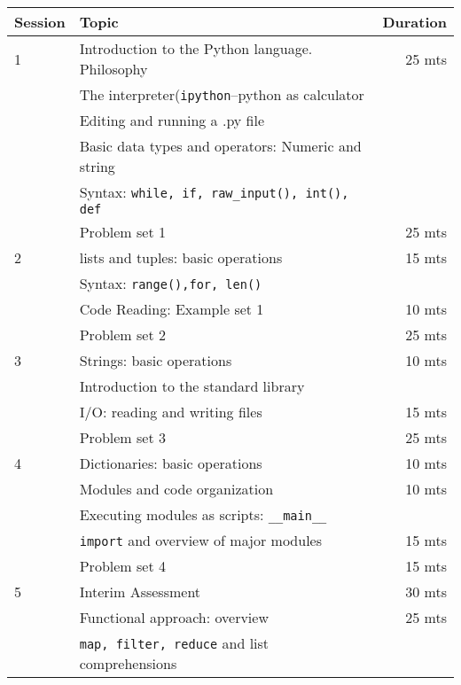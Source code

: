 \documentclass{article}
\begin{document}
\begin{tabular}{llr}
Session & Topic & Duration\\\hline
1 & Introduction to the Python language. Philosophy           & 25 mts\\
  & The interpreter(\texttt{ipython}--python as calculator        & \\
  & Editing and running a .py file                            & \\
  & Basic data types and operators: Numeric and string        & \\
  & Syntax: \tt{while, if, raw\_input(), int(), def}          & \\
  & Problem set 1                                             & 25 mts\\\hline

2 & lists and tuples: basic operations                        & 15 mts\\
  & Syntax: \tt{range(),for, len()}                           & \\
  & Code Reading: Example set 1                               & 10 mts\\
  & Problem set 2                                             & 25 mts\\\hline

3 & Strings: basic operations                                 & 10 mts\\
  & Introduction to the standard library                      & \\
  & I/O: reading and writing files                            & 15 mts\\
  & Problem set 3                                             & 25 mts\\\hline

4 & Dictionaries: basic operations                            & 10 mts\\
  & Modules and code organization                             & 10 mts\\
  & Executing modules as scripts: \texttt{\_\_main\_\_}       &\\
  & \texttt{import} and overview of major modules             & 15 mts\\
  & Problem set 4                                             & 15 mts\\\hline  

5 & Interim Assessment                                        & 30 mts\\
  & Functional approach: overview                             & 25 mts\\
  & \texttt{map, filter, reduce} and list comprehensions      & \\\hline


\end{tabular}
\end{document}
